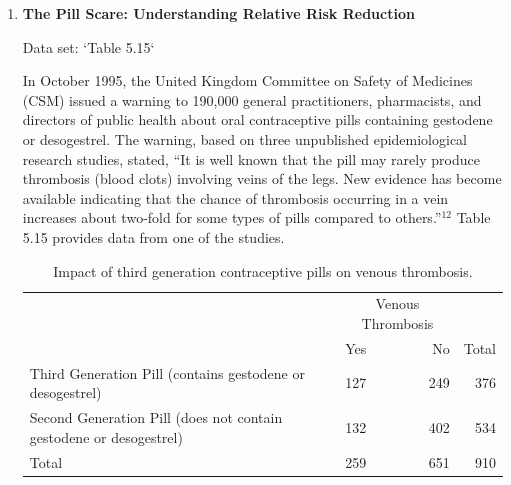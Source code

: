 \documentclass[
]{book}
\begin{document}
\begin{enumerate}
  \begin{enumerate}
    \item Conduct a chi-square test to test the hypothesis that the proportion of deaths is different depending on the drug (treatment or placebo). Write the null and alternative hypotheses and clearly state your conclusions.
    \item The extended activities showed that the percentage of deaths from heart attacks only changed from 8.5\% to 5\% over a five-year time period. Is this difference of 3.5\% too small to be of practical importance? Why or why not?
  \end{enumerate}

  \item \textbf{The Pill Scare: Understanding Relative Risk Reduction}    

  Data set: `Table 5.15` 
  
  In October 1995, the United Kingdom Committee on Safety of Medicines (CSM) issued a warning to 190,000 general practitioners, pharmacists, and directors of public health about oral contraceptive pills containing gestodene or desogestrel. The warning, based on three unpublished epidemiological research studies, stated, “It is well known that the pill may rarely produce thrombosis (blood clots) involving veins of the legs. New evidence has become available indicating that the chance of thrombosis occurring in a vein increases about two-fold for some types of pills compared to others.”$^{12}$ Table 5.15 provides data from one of the studies.  

\begin{table}[!h]
\centering
\caption{\label{tab:tab15} Impact of third generation contraceptive pills on venous thrombosis.}
\centering
\begin{tabular}[t]{>{\raggedright\arraybackslash}p{6cm}lrr}
\toprule
\multicolumn{1}{c}{ } & \multicolumn{2}{c}{Venous Thrombosis} & \multicolumn{1}{c}{ } \\
\cmidrule(l{3pt}r{3pt}){2-3}
  & Yes & No & Total\\
\midrule
Third Generation Pill
(contains gestodene or desogestrel) & 127 & 249 & 376\\
Second Generation Pill
(does not contain gestodene or desogestrel) & 132 & 402 & 534\\
Total & 259 & 651 & 910\\
\bottomrule
\end{tabular}
\end{table}


\end{enumerate}
\end{document}
